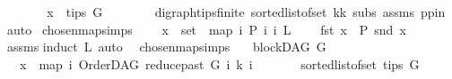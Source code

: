 \begin{isabellebody}
\ \ \ \ \isamarkupfalse%
\ \isamarkupfalse%
\ {\isachardoublequoteopen}x\ {\isasymin}\ tips\ G{\isachardoublequoteclose}\isanewline
\ \ \ \ \ \ \isamarkupfalse%
\ digraph{\isachardot}{\kern0pt}tips{\isacharunderscore}{\kern0pt}finite\ sorted{\isacharunderscore}{\kern0pt}list{\isacharunderscore}{\kern0pt}of{\isacharunderscore}{\kern0pt}set{\isacharparenleft}{\kern0pt}{}{\isacharparenright}{\kern0pt}\ kk\ subs\ assms\ pp{\isacharunderscore}{\kern0pt}in\ \isamarkupfalse%
\ auto\isanewline
{}\isamarkupfalse%
%
\endisatagproof
{\isafoldproof}%
%
\isadelimproof
\isanewline
%
\endisadelimproof
\isanewline
\isanewline
{}\isamarkupfalse%
\ chosen{\isacharunderscore}{\kern0pt}map{\isacharunderscore}{\kern0pt}simps{}{\isacharcolon}{\kern0pt}\isanewline
\ \ \ {\isachardoublequoteopen}\ x\ {\isasymin}\ set\ \ {\isacharparenleft}{\kern0pt}map\ {\isacharparenleft}{\kern0pt}{\isasymlambda}i{\isachardot}{\kern0pt}\ {\isacharparenleft}{\kern0pt}P\ i{\isacharcomma}{\kern0pt}\ i{\isacharparenright}{\kern0pt}{\isacharparenright}{\kern0pt}\ L{\isacharparenright}{\kern0pt}{\isachardoublequoteclose}\isanewline
\ \ \ \ {\isachardoublequoteopen}fst\ x\ {\isacharequal}{\kern0pt}\ P\ {\isacharparenleft}{\kern0pt}snd\ x{\isacharparenright}{\kern0pt}{\isachardoublequoteclose}\isanewline
%
\isadelimproof
\ \ %
\endisadelimproof
%
\isatagproof
{}\isamarkupfalse%
\ assms\isanewline
{}\isamarkupfalse%
{\isacharparenleft}{\kern0pt}induct\ L{\isacharcomma}{\kern0pt}\ auto{\isacharparenright}{\kern0pt}\ \isamarkupfalse%
%
\endisatagproof
{\isafoldproof}%
%
\isadelimproof
\isanewline
%
\endisadelimproof
\isanewline
{}\isamarkupfalse%
\ chosen{\isacharunderscore}{\kern0pt}map{\isacharunderscore}{\kern0pt}simps{\isacharcolon}{\kern0pt}\isanewline
\ \ \ {\isachardoublequoteopen}blockDAG\ G{\isachardoublequoteclose}\isanewline
\ \ \ {\isachardoublequoteopen}x\ {\isacharequal}{\kern0pt}\ map\ {\isacharparenleft}{\kern0pt}{\isasymlambda}i{\isachardot}{\kern0pt}\ {\isacharparenleft}{\kern0pt}OrderDAG\ {\isacharparenleft}{\kern0pt}reduce{\isacharunderscore}{\kern0pt}past\ G\ i{\isacharparenright}{\kern0pt}\ k{\isacharcomma}{\kern0pt}\ i{\isacharparenright}{\kern0pt}{\isacharparenright}{\kern0pt}\isanewline
\ \ \ \ \ \ \ {\isacharparenleft}{\kern0pt}sorted{\isacharunderscore}{\kern0pt}list{\isacharunderscore}{\kern0pt}of{\isacharunderscore}{\kern0pt}set\ {\isacharparenleft}{\kern0pt}tips\ G{\isacharparenright}{\kern0pt}{\isacharparenright}{\kern0pt}{\isachardoublequoteclose}\ \isanewline

\end{isabellebody}
